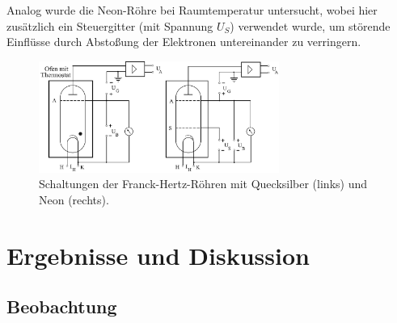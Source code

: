 \documentclass[
	a4paper,
	12pt,
	pagesize,
	ngerman
]{scrartcl}
\begin{document}
	Analog wurde die Neon-Röhre bei Raumtemperatur untersucht, wobei hier zusätzlich ein Steuergitter (mit Spannung $U_S$) verwendet wurde, um störende Einflüsse durch Abstoßung der Elektronen untereinander zu verringern. %
	
	\begin{figure}[H]
		\includegraphics[width=0.7\textwidth]{Roehren}
		\centering
		\caption{Schaltungen der Franck-Hertz-Röhren mit Quecksilber (links) und Neon (rechts).\cite{Roehren} }
		\label{Roehren_Schaltung}
		\centering
	\end{figure}

	\section{Ergebnisse und Diskussion}
	

	\subsection{Beobachtung}
	
	
	
	
\end{document}
